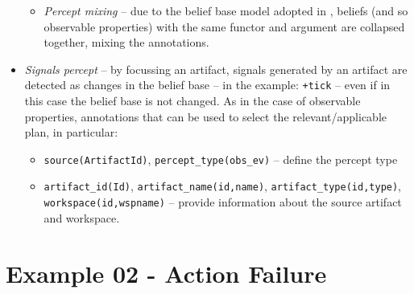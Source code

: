 \documentclass[11pt]{report}
\newcommand\code[1]{{\small{\mbox{\texttt{{#1}}}}}}
\newcommand{\jason}{\mbox{\sf{\emph{{Jason}}}}}
\begin{document}
\begin{itemize}
\begin{itemize}
\item \emph{Percept mixing} -- due to the belief base model adopted in {\jason}, beliefs (and so observable properties) with the same functor and argument are collapsed together, mixing the annotations.
\end{itemize}

\item \emph{Signals percept} -- by focussing an artifact, signals generated by an artifact are detected as changes in the belief base -- in the example: \code{+tick} -- even if in this case the belief base is not changed.
%
As in the case of observable properties, annotations that can be used to select the relevant/applicable plan, in particular:
\begin{itemize}
\item \code{source(ArtifactId)}, \code{percept\_type(obs\_ev)} -- define the percept type
\item \code{artifact\_id(Id)}, \code{artifact\_name(id,name)}, \code{artifact\_type(id,type)}, \code{workspace(id,wspname)} -- provide information about the source artifact and workspace.
%
\end{itemize}
%

\end{itemize}


\newpage
\section{Example 02 - Action Failure}
\end{document}

